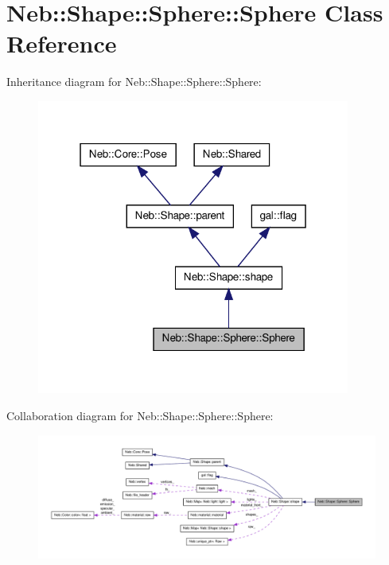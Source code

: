 \hypertarget{classNeb_1_1Shape_1_1Sphere_1_1Sphere}{\section{\-Neb\-:\-:\-Shape\-:\-:\-Sphere\-:\-:\-Sphere \-Class \-Reference}
\label{classNeb_1_1Shape_1_1Sphere_1_1Sphere}
}


\-Inheritance diagram for \-Neb\-:\-:\-Shape\-:\-:\-Sphere\-:\-:\-Sphere\-:
\nopagebreak
\begin{figure}[H]
\begin{center}
\leavevmode
\includegraphics[width=292pt]{classNeb_1_1Shape_1_1Sphere_1_1Sphere__inherit__graph}
\end{center}
\end{figure}


\-Collaboration diagram for \-Neb\-:\-:\-Shape\-:\-:\-Sphere\-:\-:\-Sphere\-:
\nopagebreak
\begin{figure}[H]
\begin{center}
\leavevmode
\includegraphics[width=350pt]{classNeb_1_1Shape_1_1Sphere_1_1Sphere__coll__graph}
\end{center}
\end{figure}
